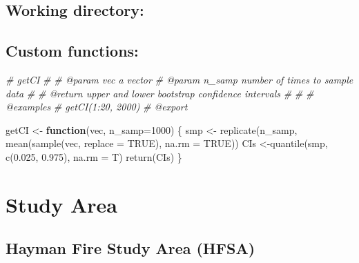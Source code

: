 \documentclass[
]{article}
\newenvironment{Shaded}{\begin{snugshade}}{\end{snugshade}}
\newcommand{\AttributeTok}[1]{\textcolor[rgb]{0.77,0.63,0.00}{#1}}
\newcommand{\CommentTok}[1]{\textcolor[rgb]{0.56,0.35,0.01}{\textit{#1}}}
\newcommand{\ConstantTok}[1]{\textcolor[rgb]{0.00,0.00,0.00}{#1}}
\newcommand{\ControlFlowTok}[1]{\textcolor[rgb]{0.13,0.29,0.53}{\textbf{#1}}}
\newcommand{\DecValTok}[1]{\textcolor[rgb]{0.00,0.00,0.81}{#1}}
\newcommand{\FloatTok}[1]{\textcolor[rgb]{0.00,0.00,0.81}{#1}}
\newcommand{\FunctionTok}[1]{\textcolor[rgb]{0.00,0.00,0.00}{#1}}
\newcommand{\NormalTok}[1]{#1}
\newcommand{\OtherTok}[1]{\textcolor[rgb]{0.56,0.35,0.01}{#1}}
\begin{document}
\hypertarget{working-directory}{%
\subsection{Working directory:}\label{working-directory}}

\hypertarget{custom-functions}{%
\subsection{Custom functions:}\label{custom-functions}}

\begin{Shaded}
\begin{Highlighting}[]
\CommentTok{\#\textquotesingle{} getCI}
\CommentTok{\#\textquotesingle{} }
\CommentTok{\#\textquotesingle{} @param vec a vector}
\CommentTok{\#\textquotesingle{} @param n\_samp number of times to sample data}
\CommentTok{\#\textquotesingle{}}
\CommentTok{\#\textquotesingle{} @return upper and lower bootstrap confidence intervals}
\CommentTok{\#\textquotesingle{} }
\CommentTok{\#\textquotesingle{}}
\CommentTok{\#\textquotesingle{} @examples}
\CommentTok{\#\textquotesingle{}    getCI(1:20, 2000)}
\CommentTok{\#\textquotesingle{} @export}

\NormalTok{getCI }\OtherTok{\textless{}{-}} \ControlFlowTok{function}\NormalTok{(vec, }\AttributeTok{n\_samp=}\DecValTok{1000}\NormalTok{) \{}
\NormalTok{  smp }\OtherTok{\textless{}{-}} \FunctionTok{replicate}\NormalTok{(n\_samp, }\FunctionTok{mean}\NormalTok{(}\FunctionTok{sample}\NormalTok{(vec, }\AttributeTok{replace =} \ConstantTok{TRUE}\NormalTok{), }\AttributeTok{na.rm =} \ConstantTok{TRUE}\NormalTok{))}
\NormalTok{  CIs }\OtherTok{\textless{}{-}}\FunctionTok{quantile}\NormalTok{(smp, }\FunctionTok{c}\NormalTok{(}\FloatTok{0.025}\NormalTok{, }\FloatTok{0.975}\NormalTok{), }\AttributeTok{na.rm =}\NormalTok{ T)}
  \FunctionTok{return}\NormalTok{(CIs)}
\NormalTok{\}}
\end{Highlighting}
\end{Shaded}

\hypertarget{study-area}{%
\section{Study Area}\label{study-area}}

\hypertarget{hayman-fire-study-area-hfsa}{%
\subsection{Hayman Fire Study Area
(HFSA)}\label{hayman-fire-study-area-hfsa}}
\end{document}
